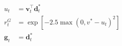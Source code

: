 \documentclass[border=8pt,12pt]{standalone}
\begin{document}
\color{ink}
$\displaystyle \begin{aligned}u_t&=\mathbf v_t^\top\mathbf d_t^*\\ r_t^G&=\exp\!\left[-2.5\max(0,v^*-u_t)^2\right]\\ \mathbf g_t&=\mathbf d_t^*\end{aligned}$
\end{document}
